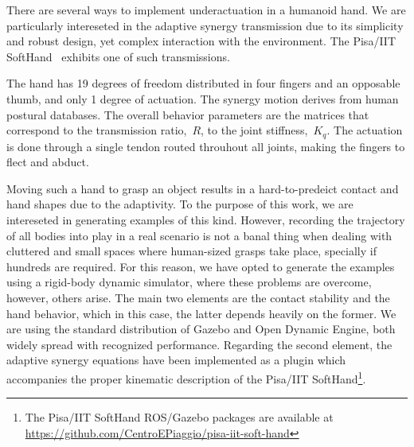 
There are several ways to implement underactuation in a humanoid hand. We are particularly intereseted in the adaptive synergy transmission due to its simplicity and robust design, yet complex interaction with the environment. The Pisa/IIT SoftHand~\cite{Catalano2014Adaptive} exhibits one of such transmissions.

The hand has 19 degrees of freedom distributed in
four fingers and an opposable thumb, and only 1 degree of actuation. The synergy motion derives from human postural databases. The overall behavior parameters are the matrices that correspond to the transmission ratio,~$R$, to the joint stiffness,~$K_q$. The actuation is done through a single tendon routed throuhout all joints, making the fingers to flect and abduct.


Moving such a hand to grasp an object results in a hard-to-predeict contact and hand shapes due to the adaptivity. To the purpose of this work, we are intereseted in generating examples of this kind. However, recording the trajectory of all bodies into play in a real scenario is not a banal thing when dealing with cluttered and small spaces where human-sized grasps take place, specially if hundreds are required. For this reason, we have opted to generate the examples using a rigid-body dynamic simulator, where these problems are overcome, however, others arise. The main two elements are the contact stability and the hand behavior, which in this case, the latter depends heavily on the former. We are using the standard distribution of Gazebo and Open Dynamic Engine, both widely spread with recognized performance.
Regarding the second element, the adaptive synergy equations have been implemented as a plugin which accompanies the proper kinematic description of the Pisa/IIT SoftHand\footnote{The Pisa/IIT SoftHand ROS/Gazebo packages are available at \url{https://github.com/CentroEPiaggio/pisa-iit-soft-hand}}.

